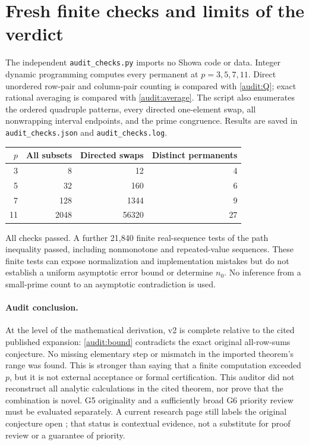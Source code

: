 \documentclass[11pt,a4paper]{article}
\begin{document}
\section{Fresh finite checks and limits of the verdict}
The independent \texttt{audit\_checks.py} imports no Showa code or data. Integer dynamic programming computes every permanent at $p=3,5,7,11$. Direct unordered row-pair and column-pair counting is compared with \eqref{audit:Q}; exact rational averaging is compared with \eqref{audit:average}. The script also enumerates the ordered quadruple patterns, every directed one-element swap, all nonwrapping interval endpoints, and the prime congruence. Results are saved in \texttt{audit\_checks.json} and \texttt{audit\_checks.log}.
\begin{center}
\begin{tabular}{rrrr}
\toprule
$p$ & All subsets & Directed swaps & Distinct permanents\\\midrule
3&8&12&4\\
5&32&160&6\\
7&128&1344&9\\
11&2048&56320&27\\\bottomrule
\end{tabular}
\end{center}
All checks passed. A further 21,840 finite real-sequence tests of the path inequality passed, including nonmonotone and repeated-value sequences. These finite tests can expose normalization and implementation mistakes but do not establish a uniform asymptotic error bound or determine $n_0$. No inference from a small-prime count to an asymptotic contradiction is used.

\paragraph{Audit conclusion.}
At the level of the mathematical derivation, v2 is complete relative to the cited published expansion: \eqref{audit:bound} contradicts the exact original all-row-sums conjecture. No missing elementary step or mismatch in the imported theorem's range was found. This is stronger than saying that a finite computation exceeded $p$, but it is not external acceptance or formal certification. This auditor did not reconstruct all analytic calculations in the cited theorem, nor prove that the combination is novel. G5 originality and a sufficiently broad G6 priority review must be evaluated separately. A current research page still labels the original conjecture open \cite{audit:Lavi}; that status is contextual evidence, not a substitute for proof review or a guarantee of priority.
\end{document}
